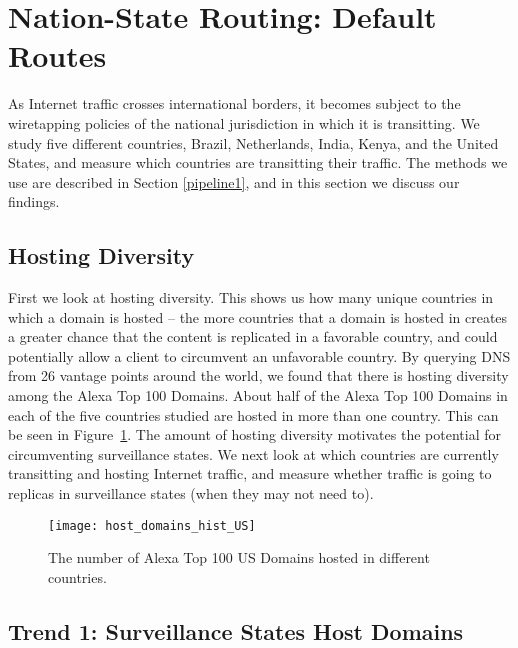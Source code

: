 \section{Nation-State Routing: Default \\Routes}
\label{measure}

As Internet traffic crosses international borders, it becomes subject to the wiretapping policies of the national jurisdiction in which it is transitting.  We study five different countries, Brazil, Netherlands, India, Kenya, and the United States, and measure which countries are transitting their traffic.  The methods we use are described in Section \ref{pipeline1}, and in this section we discuss our findings.

\subsection{Hosting Diversity}
First we look at hosting diversity.  This shows us how many unique countries in which a domain is hosted -- the more countries that a domain is hosted in creates a greater chance that the content is replicated in a favorable country, and could potentially allow a client to circumvent an unfavorable country.  By querying DNS from 26 vantage points around the world, we found that there is hosting diversity among the Alexa Top 100 Domains.  About half of the Alexa Top 100 Domains in each of the five countries studied are hosted in more than one country.  This can be seen in Figure~\ref{fig:host_diversity}.  The amount of hosting diversity motivates the potential for circumventing surveillance states.  We next look at which countries are currently transitting and hosting Internet traffic, and measure whether traffic is going to replicas in surveillance states (when they may not need to).

\begin{figure}
\centering
\texttt{[image: host\_domains\_hist\_US]}
\caption{The number of Alexa Top 100 US Domains hosted in different countries.}
\label{fig:host_diversity}
\end{figure}

\subsection{Trend 1: Surveillance States Host Domains}

